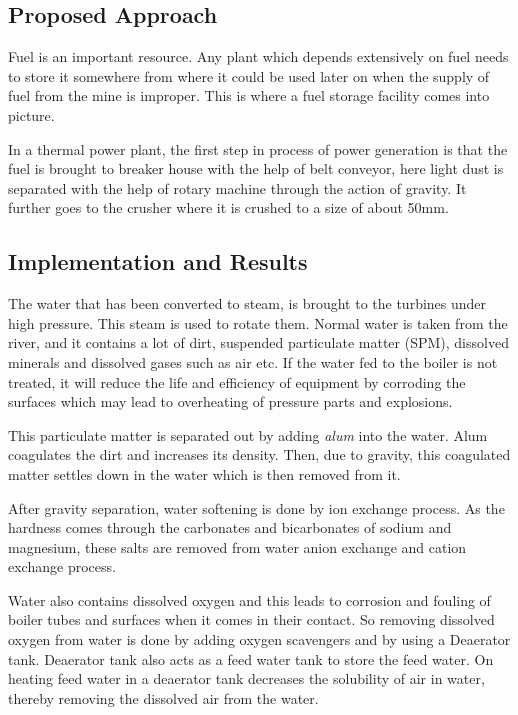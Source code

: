 \documentclass{report}
\begin{document}
\subsection{Proposed Approach}
Fuel is an important resource. Any plant which depends extensively on fuel needs to store it somewhere from where it could be used later on when the supply of fuel from the mine is improper. This is where a fuel storage facility comes into picture. \par In a thermal power plant, the first step in process of power generation is that the fuel is brought to breaker house with the help of belt conveyor, here light dust is separated with the help of rotary machine through the action of gravity. It further goes to the crusher where it is crushed to a size of about 50mm.
\subsection{Implementation and Results}
The water that has been converted to steam, is brought to the turbines under high pressure. This steam is used to rotate them. Normal water is taken from the river, and it contains a lot of dirt, suspended particulate matter (SPM), dissolved minerals and dissolved gases such as air etc. If the water fed to the boiler is not treated, it will reduce the life and efficiency of equipment by corroding the surfaces which may lead to overheating of pressure parts and explosions. \par This particulate matter is separated out by adding {\it alum} into the water. Alum coagulates the dirt and increases its density. Then, due to gravity, this coagulated matter settles down in the water which is then removed from it. 


\par After gravity separation, water softening is done by ion exchange process. As the hardness comes through the carbonates and bicarbonates of sodium and magnesium, these salts are removed from water anion exchange and cation exchange process. \par Water also contains dissolved oxygen and this leads to corrosion and fouling of boiler tubes and surfaces when it comes in their contact. So removing dissolved oxygen from water is done by adding oxygen scavengers and by using a Deaerator tank. Deaerator tank also acts as a feed water tank to store the feed water. On heating feed water in a deaerator tank decreases the solubility of air in water, thereby removing the dissolved air from the water.
\end{document}
